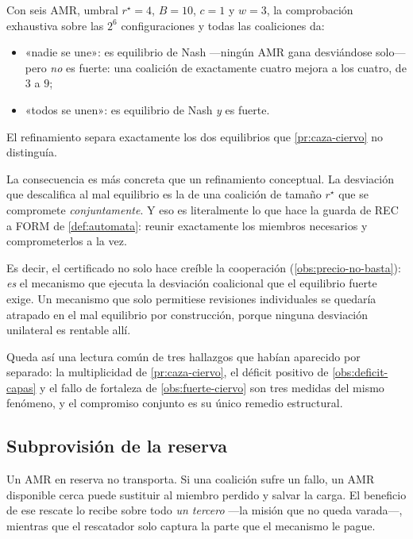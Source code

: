 \begin{observacion}
\label{obs:fuerte-ciervo}
Con seis AMR, umbral $r^\star=4$, $B=10$, $c=1$ y $w=3$, la comprobación
exhaustiva sobre las $2^{6}$ configuraciones y todas las coaliciones da:
\begin{itemize}[leftmargin=1.9em,topsep=0.2em,itemsep=0.15em]
  \item «nadie se une»: es equilibrio de Nash —ningún AMR gana desviándose
  solo— pero \emph{no} es fuerte: una coalición de exactamente cuatro mejora a
  los cuatro, de $3$ a $9$;
  \item «todos se unen»: es equilibrio de Nash \emph{y} es fuerte.
\end{itemize}
El refinamiento separa exactamente los dos equilibrios que
\cref{pr:caza-ciervo} no distinguía.
\end{observacion}

\begin{observacion}
\label{obs:guarda-fuerte}
La consecuencia es más concreta que un refinamiento conceptual. La desviación que
descalifica al mal equilibrio es la de una coalición de tamaño $r^\star$ que se
compromete \emph{conjuntamente}. Y eso es literalmente lo que hace la guarda de
\textsf{REC} a \textsf{FORM} de \cref{def:automata}: reunir exactamente los
miembros necesarios y comprometerlos a la vez.

Es decir, el certificado no solo hace creíble la cooperación
(\cref{obs:precio-no-basta}): \emph{es} el mecanismo que ejecuta la desviación
coalicional que el equilibrio fuerte exige. Un mecanismo que solo permitiese
revisiones individuales se quedaría atrapado en el mal equilibrio por
construcción, porque ninguna desviación unilateral es rentable allí.

Queda así una lectura común de tres hallazgos que habían aparecido por separado:
la multiplicidad de \cref{pr:caza-ciervo}, el déficit positivo de
\cref{obs:deficit-capas} y el fallo de fortaleza de \cref{obs:fuerte-ciervo} son
tres medidas del mismo fenómeno, y el compromiso conjunto es su único remedio
estructural.
\end{observacion}

\subsection{Subprovisión de la reserva}

Un AMR en reserva no transporta. Si una coalición sufre un fallo, un AMR
disponible cerca puede sustituir al miembro perdido y salvar la carga. El
beneficio de ese rescate lo recibe sobre todo \emph{un tercero} —la misión que
no queda varada—, mientras que el rescatador solo captura la parte que el
mecanismo le pague.

